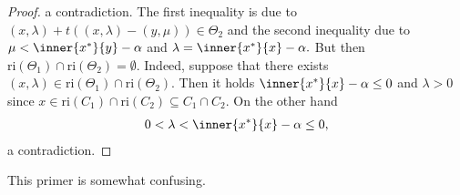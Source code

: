 \begin{proof}
a contradiction.
The first inequality is due to 
$
  (x,\lambda)
  +
  t
  (
  (x,\lambda)
  -
  (y,\mu)
  )
  \in \Theta_2
$
and the second inequality due to
$
      \mu    
      <
      \inner{x^*}{y} - \alpha
$
and
$
      \lambda
      =
      \inner{x^*}{x} - \alpha
      .
$
But then 
$
\mathrm{ri}(\Theta_1)\cap\mathrm{ri}(\Theta_2)=\emptyset
.
$
Indeed, suppose that there exists 
$
  (x,\lambda)
  \in
  \mathrm{ri}(\Theta_1)\cap\mathrm{ri}(\Theta_2)
  .
$
Then it holds
$
  \inner{x^*}{x}
  -
  \alpha
  \le
  0
$
and $\lambda>0$
since 
$
 x
 \in
  \mathrm{ri}(C_1)\cap\mathrm{ri}(C_2)
  \subseteq
  C_1\cap C_2.
$
On the other hand
\begin{gather}
  0
  <
  \lambda
  <
  \inner{x^*}{x}
  -
  \alpha
  \le
  0
  ,
\end{gather}
a contradiction.
\end{proof}

\begin{takeaways}
  This primer is somewhat confusing.
  \lipsum[5]
\end{takeaways}
